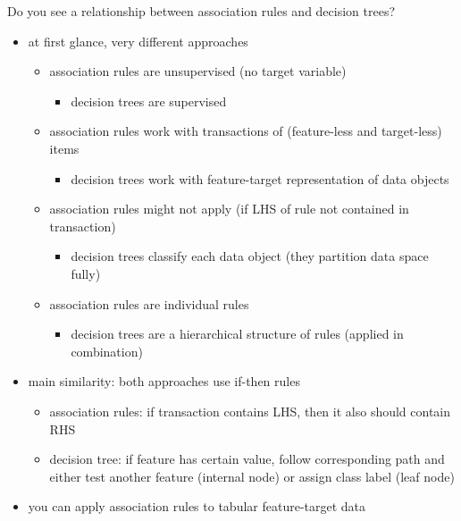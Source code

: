 \documentclass[12pt]{article}
\begin{document}
\begin{question}
	Do you see a relationship between association rules and decision trees?
\end{question}

\begin{itemize}[left=0pt, nosep]
	\item at first glance, very different approaches
	\begin{itemize}[left=0pt, nosep]
		\item association rules are unsupervised (no target variable)
		\begin{itemize}[left=0pt, nosep]
			\item decision trees are supervised
		\end{itemize}
		\item association rules work with transactions of (feature-less and target-less) items
		\begin{itemize}[left=0pt, nosep]
			\item decision trees work with feature-target representation of data objects
		\end{itemize}
		\item association rules might not apply (if LHS of rule not contained in transaction)
		\begin{itemize}[left=0pt, nosep]
			\item decision trees classify each data object (they partition data space fully)
		\end{itemize}
		\item association rules are individual rules
		\begin{itemize}[left=0pt, nosep]
			\item decision trees are a hierarchical structure of rules (applied in combination)
		\end{itemize}
	\end{itemize}
	\item main similarity: both approaches use if-then rules
	\begin{itemize}[left=0pt, nosep]
		\item association rules: if transaction contains LHS, then it also should contain RHS
		\item decision tree: if feature has certain value, follow corresponding path and either test another feature (internal node) or assign class label (leaf node)
	\end{itemize}
	\item you can apply association rules to tabular feature-target data

\end{itemize}
\end{document}
